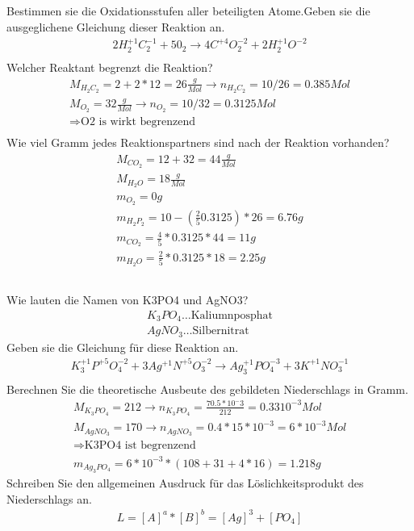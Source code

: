 \documentclass[a4paper]{article}
\newcommand{\gpm}{\frac{g}{Mol}}
\begin{document}
\subsection{}
Bestimmen sie die Oxidationsstufen aller beteiligten Atome.Geben sie die
ausgeglichene Gleichung dieser Reaktion an.
\begin{align}
  2 H_2^{+1}C_2^{-1} + 5 0_2 \rightarrow 4 C^{+4}O_2^{-2} + 2 H_2^{+1}O^{-2}\\
\end{align}
Welcher Reaktant begrenzt die Reaktion?
\begin{align}
  M_{H_2C_2}=2+2*12=26\gpm \rightarrow n_{H_2C_2}=10/26=0.385 Mol\\
  M_{O_2}=32\gpm \rightarrow n_{O_2}=10/32=0.3125 Mol\\
  \Rightarrow\text{O2 is wirkt begrenzend}\\
\end{align}
Wie viel Gramm jedes
Reaktionspartners sind nach der Reaktion vorhanden?
\begin{align}
  M_{CO_2}=12+32=44\gpm\\
  M_{H_2O}=18\gpm\\
  m_{O_2}=0g\\
  m_{H_2P_2}=10-(\frac{2}{5}0.3125)*26=6.76g\\
  m_{CO_2}=\frac{4}{5}*0.3125*44=11g\\
  m_{H_2O}=\frac{2}{5}*0.3125*18=2.25g
\end{align}

\subsection{}
Wie lauten die Namen von K3PO4 und AgNO3?
\begin{align}
  K_3PO_4 \dots \text{Kaliumnposphat}\\
  AgNO_3 \dots \text{Silbernitrat}
\end{align}
Geben sie die Gleichung für diese Reaktion an.
\begin{align}
  K_3^{+1}P^{+5}O_4^{-2} + 3 Ag^{+1}N^{+5}O_3^{-2} \rightarrow Ag_3^{+1}PO_4^{-3} + 3 K^{+1}NO_3^{-1}\\
\end{align}
Berechnen Sie die theoretische Ausbeute des gebildeten Niederschlags in Gramm.
\begin{align}
  M_{K_3PO_4}=212 \rightarrow n_{K_3PO_4}=\frac{70.5*10^-3}{212}=0.33 10^{-3}Mol\\
  M_{AgNO_3}=170 \rightarrow n_{AgNO_3}=0.4*15*10^{-3}=6*10^{-3}Mol\\
  \Rightarrow \text{K3PO4 ist begrenzend}\\
  m_{Ag_3PO_4}=6*10^{-3}*(108+31+4*16)=1.218g
\end{align}
Schreiben Sie den allgemeinen Ausdruck für das Löslichkeitsprodukt des Niederschlags an.
\begin{align}
  L = [A]^a*[B]^b = [Ag]^3+[PO_4] 
\end{align}
\end{document}

